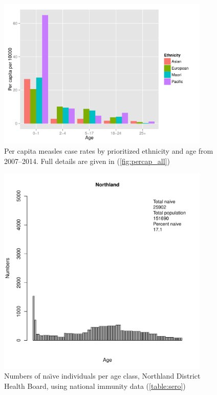 \documentclass{article}
\begin{document}
\begin{figure}[H]
     \begin{center}
     \includegraphics[width=0.9\textwidth]{percap_eth_age.pdf}
     \end{center}
     \caption{Per capita measles case rates by prioritized ethnicity and age from 2007--2014. Full details are given in (\autoref{fig:percap_all})}
     \label{fig:PerCapAgeEth}
\end{figure}


\begin{figure}[H]
     \begin{center}
     \includegraphics[width=0.9\textwidth]{dhb1.pdf}
     \end{center}
     \caption{Numbers of na\"{\i}ve individuals per age class, Northland District Health Board, using national immunity data (\autoref{table:sero})}
     \label{fig:Northland}
\end{figure}
\end{document}
